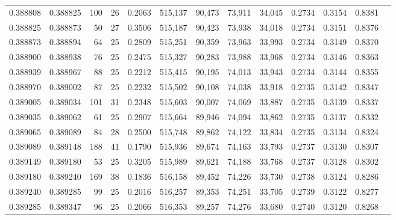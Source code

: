 \begin{tabular}{rrrrrrrrrrrrr}
0.388808 & 0.388825 &   100 &  26 &                                     0.2063 & 515,137 &  90,473 &  73,911 &  34,045 & 0.2734 & 0.3154 & 0.8381 \\
0.388825 & 0.388873 &    50 &  27 &                                     0.3506 & 515,187 &  90,423 &  73,938 &  34,018 & 0.2734 & 0.3151 & 0.8376 \\
0.388873 & 0.388894 &    64 &  25 &                                     0.2809 & 515,251 &  90,359 &  73,963 &  33,993 & 0.2734 & 0.3149 & 0.8370 \\
0.388900 & 0.388938 &    76 &  25 &                                     0.2475 & 515,327 &  90,283 &  73,988 &  33,968 & 0.2734 & 0.3146 & 0.8363 \\
0.388939 & 0.388967 &    88 &  25 &                                     0.2212 & 515,415 &  90,195 &  74,013 &  33,943 & 0.2734 & 0.3144 & 0.8355 \\
0.388970 & 0.389002 &    87 &  25 &                                     0.2232 & 515,502 &  90,108 &  74,038 &  33,918 & 0.2735 & 0.3142 & 0.8347 \\
0.389005 & 0.389034 &   101 &  31 &                                     0.2348 & 515,603 &  90,007 &  74,069 &  33,887 & 0.2735 & 0.3139 & 0.8337 \\
0.389035 & 0.389062 &    61 &  25 &                                     0.2907 & 515,664 &  89,946 &  74,094 &  33,862 & 0.2735 & 0.3137 & 0.8332 \\
0.389065 & 0.389089 &    84 &  28 &                                     0.2500 & 515,748 &  89,862 &  74,122 &  33,834 & 0.2735 & 0.3134 & 0.8324 \\
0.389089 & 0.389148 &   188 &  41 &                                     0.1790 & 515,936 &  89,674 &  74,163 &  33,793 & 0.2737 & 0.3130 & 0.8307 \\
0.389149 & 0.389180 &    53 &  25 &                                     0.3205 & 515,989 &  89,621 &  74,188 &  33,768 & 0.2737 & 0.3128 & 0.8302 \\
0.389180 & 0.389240 &   169 &  38 &                                     0.1836 & 516,158 &  89,452 &  74,226 &  33,730 & 0.2738 & 0.3124 & 0.8286 \\
0.389240 & 0.389285 &    99 &  25 &                                     0.2016 & 516,257 &  89,353 &  74,251 &  33,705 & 0.2739 & 0.3122 & 0.8277 \\
0.389285 & 0.389347 &    96 &  25 &                                     0.2066 & 516,353 &  89,257 &  74,276 &  33,680 & 0.2740 & 0.3120 & 0.8268 \\

\end{tabular}
